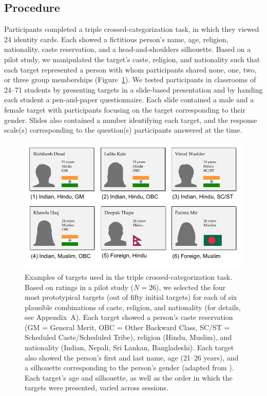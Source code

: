 \documentclass[12pt, a4paper]{article}
\begin{document}
\subsection{Procedure}

Participants completed a triple crossed-categorization task, in which they viewed 24 identity cards. Each showed a fictitious person's name, age, religion, nationality, caste reservation, and a head-and-shoulders silhouette. Based on a pilot study, we manipulated the target's caste, religion, and nationality such that each target represented a person with whom participants shared none, one, two, or three group memberships (Figure~\ref{fig:f2}). We tested participants in classrooms of 24--71 students by presenting targets in a slide-based presentation and by handing each student a pen-and-paper questionnaire. Each slide contained a male and a female target with participants focusing on the target corresponding to their gender. Slides also contained a number identifying each target, and the response scale(s) corresponding to the question(s) participants answered at the time.

\begin{figure}
\centering
\includegraphics[scale=1]{../figures/figure-2}
\caption{Examples of targets used in the triple crossed-categorization task. Based on ratings in a pilot study ($N = 26$), we selected the four most prototypical targets (out of fifty initial targets) for each of six plausible combinations of caste, religion, and nationality (for details, see Appendix~A). Each target showed a person's caste reservation (GM = General Merit, OBC = Other Backward Class, SC/ST = Scheduled Caste/Scheduled Tribe), religion (Hindu, Muslim), and nationality (Indian, Nepali, Sri Lankan, Bangladeshi). Each target also showed the person's first and last name, age (21--26 years), and a silhouette corresponding to the person's gender (adapted from \protect{}). Each target's age and silhouette, as well as the order in which the targets were presented, varied across sessions.}
\label{fig:f2}
\end{figure}
\end{document}
